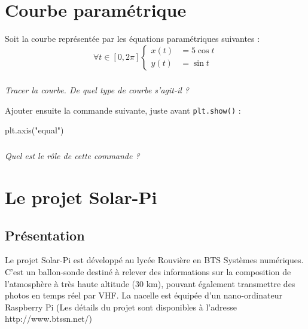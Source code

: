 \documentclass[10pt]{article}
\begin{document}
\section{Courbe paramétrique}
\setcounter{subparagraph}{0}
Soit la courbe représentée par les équations paramétriques suivantes :
\[
\forall t \in [0,2\pi]
\left\lbrace
\begin{aligned}
x(t)&=5 \cos t \\
y(t)&=\sin t
\end{aligned}
\right.
\]

\subparagraph{}
\textit{Tracer la courbe. De quel type de courbe s'agit-il ?}


\begin{py}
Ajouter ensuite la commande suivante, juste avant \texttt{plt.show()} :
\begin{python}
plt.axis("equal")
\end{python}
\end{py}

\subparagraph{}
\textit{Quel est le rôle de cette commande ?}



\section{Le projet Solar-Pi}
\setcounter{subparagraph}{0}
\subsection{Présentation}

Le projet Solar-Pi est développé au lycée Rouvière en BTS Systèmes numériques. C'est un ballon-sonde destiné à relever des informations sur la composition de l'atmosphère à très haute altitude (30 km), pouvant également transmettre des photos en temps réel par VHF. La nacelle est équipée d'un nano-ordinateur Raspberry Pi (Les détails du projet sont disponibles à l'adresse http://www.btssn.net/)
\end{document}
